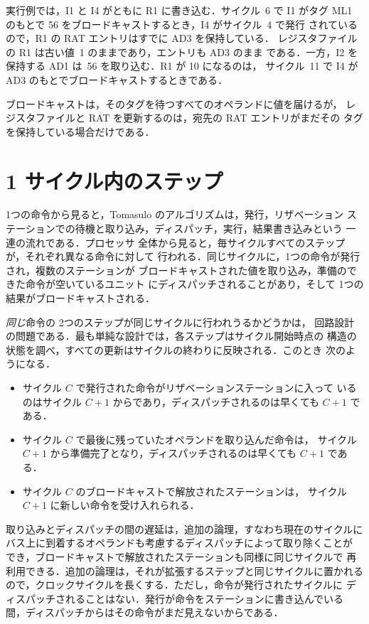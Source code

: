 \documentclass[../main.tex]{subfiles}
\begin{document}
\begin{example}
  \label{ex:l07-stale}
  実行例では，I1 と I4 がともに R1 に書き込む．サイクル~6 で I1 がタグ
  ML1 のもとで 56 をブロードキャストするとき，I4 がサイクル~4 で発行
  されているので，R1 の RAT エントリはすでに AD3 を保持している．
  レジスタファイルの R1 は古い値~1 のままであり，エントリも AD3 のまま
  である．一方，I2 を保持する AD1 は~56 を取り込む．R1 が 10 になるのは，
  サイクル~11 で I4 が AD3 のもとでブロードキャストするときである．
\end{example}

\begin{keypoint}
  ブロードキャストは，そのタグを待つすべてのオペランドに値を届けるが，
  レジスタファイルと RAT を更新するのは，宛先の RAT エントリがまだその
  タグを保持している場合だけである．
\end{keypoint}

\section{1 サイクル内のステップ}
\label{sec:l07-cycle}

1つの命令から見ると，Tomasulo のアルゴリズムは，発行，リザベーション
ステーションでの待機と取り込み，ディスパッチ，実行，結果書き込みという
一連の流れである．プロセッサ
全体から見ると，毎サイクルすべてのステップが，それぞれ異なる命令に対して
行われる．同じサイクルに，1つの命令が発行され，複数のステーションが
ブロードキャストされた値を取り込み，準備のできた命令が空いているユニット
にディスパッチされることがあり，そして 1つの結果がブロードキャストされる．

\emph{同じ}命令の 2つのステップが同じサイクルに行われうるかどうかは，
回路設計の問題である．最も単純な設計では，各ステップはサイクル開始時点の
構造の状態を調べ，すべての更新はサイクルの終わりに反映される．このとき
次のようになる．
\begin{itemize}
  \item サイクル $C$ で発行された命令がリザベーションステーションに入って
    いるのはサイクル $C+1$ からであり，ディスパッチされるのは早くても
    $C+1$ である．
  \item サイクル $C$ で最後に残っていたオペランドを取り込んだ命令は，
    サイクル $C+1$ から準備完了となり，ディスパッチされるのは早くても
    $C+1$ である．
  \item サイクル $C$ のブロードキャストで解放されたステーションは，
    サイクル $C+1$ に新しい命令を受け入れられる．
\end{itemize}
取り込みとディスパッチの間の遅延は，追加の論理，すなわち現在のサイクルに
バス上に到着するオペランドも考慮するディスパッチによって取り除くことが
でき，ブロードキャストで解放されたステーションも同様に同じサイクルで
再利用できる．追加の論理は，それが拡張するステップと同じサイクルに置かれる
ので，クロックサイクルを長くする．ただし，命令が発行されたサイクルに
ディスパッチされることはない．発行が命令をステーションに書き込んでいる
間，ディスパッチからはその命令がまだ見えないからである．
\end{document}
